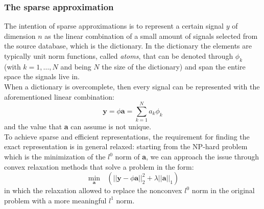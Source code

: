 \subsubsection{The sparse approximation}
The intention of sparse approximations is to represent a certain signal $y$ of dimension $n$ as the linear combination of a small amount of signals selected from the source database, which is the dictionary. In the dictionary the elements are typically unit norm functions, called \textit{atoms}, that can be denoted through $\phi_k$ (with $k = 1,\dots, N$ and being $N$ the size of the dictionary) and span the entire space the signals live in.\\
When a dictionary is overcomplete, then every signal can be represented with the aforementioned linear combination:
\begin{equation}
\textbf{y} = \textbf{$\phi$}\textbf{a} = \sum_{k=1}^{N}a_k\phi_k
\end{equation}
and the value that \textbf{a} can assume is not unique.\\
To achieve sparse and efficient representations, the requirement for finding the exact representation is in general relaxed: starting from the NP-hard problem which is the minimization of the $l^0$ norm of \textbf{a}, we can approach the issue through convex relaxation methods that solve a problem in the form:
\begin{equation}
\min_\textbf{a} \text{ } (|| \textbf{y} - \textbf{$\phi$a} ||_2^2 + \textbf{$\lambda$}||\textbf{a}||_1)
\end{equation}
in which the relaxation allowed to replace the nonconvex $l^0$ norm in the original problem with a more meaningful $l^1$ norm. \cite{Tosic2011}

